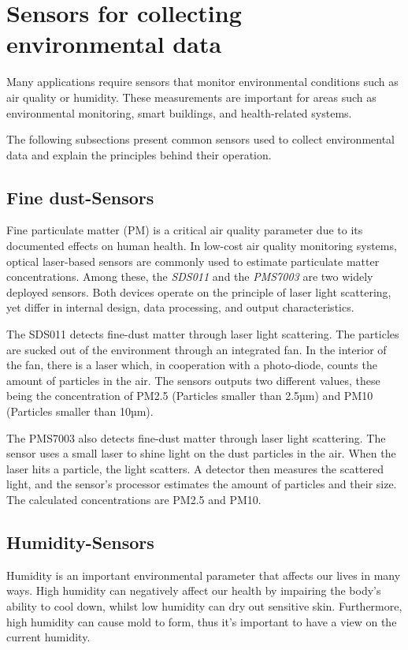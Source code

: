 \noindent\cite{LRWeb:32}

\section{Sensors for collecting environmental data}
Many applications require sensors that monitor environmental conditions such as air quality or humidity. These measurements are important for areas such as environmental monitoring, smart buildings, and health-related systems.

The following subsections present common sensors used to collect environmental data and explain the principles behind their operation.

\subsection{Fine dust-Sensors}
Fine particulate matter (PM) is a critical air quality parameter due to its documented effects on human health. In low-cost air quality monitoring systems, optical laser-based sensors are commonly used to estimate particulate matter concentrations. Among these, the \textit{SDS011} and the \textit{PMS7003} are two widely deployed sensors. Both devices operate on the principle of laser light scattering, yet differ in internal design, data processing, and output characteristics.

The SDS011 detects fine-dust matter through laser light scattering. The particles are sucked out of the environment through an integrated fan. In the interior of the fan, there is a laser which, in cooperation with a photo-diode, counts the amount of particles in the air. The sensors outputs two different values, these being the concentration of PM2.5 (Particles smaller than 2.5µm) and PM10 (Particles smaller than 10µm).

\noindent\cite{LRWeb:35}

The PMS7003 also detects fine-dust matter through laser light scattering. The sensor uses a small laser to shine light on the dust particles in the air. When the laser hits a particle, the light scatters. A detector then measures the scattered light, and the sensor's processor estimates the amount of particles and their size. The calculated concentrations are PM2.5 and PM10.

\noindent\cite{LRWeb:34}

\subsection{Humidity-Sensors}\label{title:humidity}
Humidity is an important environmental parameter that affects our lives in many ways. High humidity can negatively affect our health by impairing the body's ability to cool down, whilst low humidity can dry out sensitive skin. Furthermore, high humidity can cause mold to form, thus it's important to have a view on the current humidity. 

